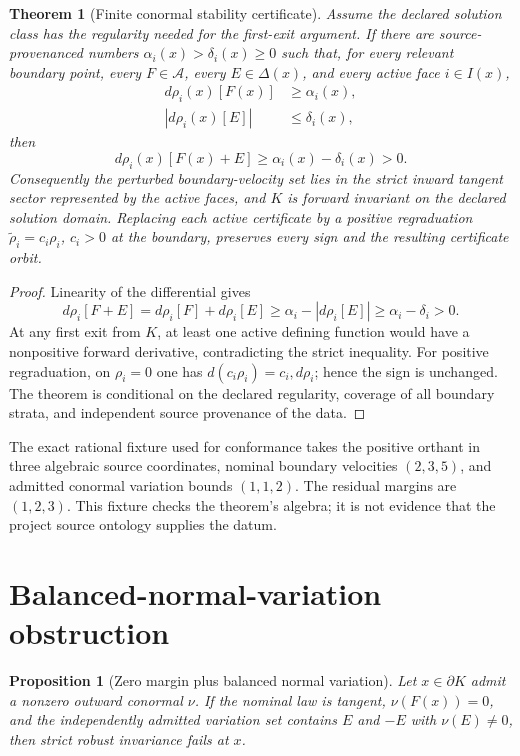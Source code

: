 \documentclass[11pt]{article}
\newtheorem{theorem}{Theorem}
\newtheorem{proposition}{Proposition}
\begin{document}
\begin{theorem}[Finite conormal stability certificate]
\label{thm:certificate}
Assume the declared solution class has the regularity needed for the
first-exit argument.  If there are source-provenanced numbers
\(\alpha_i(x)>\delta_i(x)\geq0\) such that, for every relevant boundary
point, every \(F\in\mathcal A\), every \(E\in\Delta(x)\), and every active
face \(i\in I(x)\),
\begin{align}
 d\rho_i(x)[F(x)] &\geq \alpha_i(x), \\
 |d\rho_i(x)[E]| &\leq \delta_i(x),
\end{align}
then
\[
 d\rho_i(x)[F(x)+E]\geq\alpha_i(x)-\delta_i(x)>0.
\]
Consequently the perturbed boundary-velocity set lies in the strict inward
tangent sector represented by the active faces, and \(K\) is forward
invariant on the declared solution domain.  Replacing each active certificate
by a positive regraduation \(\widetilde\rho_i=c_i\rho_i\), \(c_i>0\) at the
boundary, preserves every sign and the resulting certificate orbit.
\end{theorem}

\begin{proof}
Linearity of the differential gives
\[
 d\rho_i[F+E]
 =d\rho_i[F]+d\rho_i[E]
 \geq \alpha_i-|d\rho_i[E]|
 \geq \alpha_i-\delta_i>0.
\]
At any first exit from \(K\), at least one active defining function would
have a nonpositive forward derivative, contradicting the strict inequality.
For positive regraduation, on \(\rho_i=0\) one has
\(d(c_i\rho_i)=c_i,d\rho_i\); hence the sign is unchanged.  The theorem is
conditional on the declared regularity, coverage of all boundary strata, and
independent source provenance of the data.
\end{proof}

The exact rational fixture used for conformance takes the positive orthant in
three algebraic source coordinates, nominal boundary velocities
\((2,3,5)\), and admitted conormal variation bounds \((1,1,2)\).  The
residual margins are \((1,2,3)\).  This fixture checks the theorem's algebra;
it is not evidence that the project source ontology supplies the datum.

\section{Balanced-normal-variation obstruction}

\begin{proposition}[Zero margin plus balanced normal variation]
\label{prop:balanced}
Let \(x\in\partial K\) admit a nonzero outward conormal \(\nu\).  If the
nominal law is tangent, \(\nu(F(x))=0\), and the independently admitted
variation set contains \(E\) and \(-E\) with \(\nu(E)\neq0\), then strict
robust invariance fails at \(x\).
\end{proposition}
\end{document}
